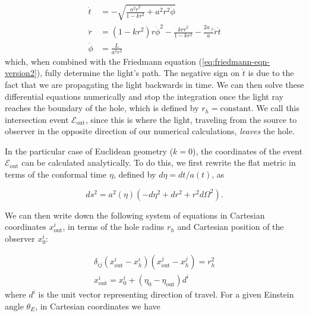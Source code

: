\begin{subequations}
  \begin{align}
    \dot{t} &= -\sqrt{\frac{a^2\dot{r}^2}{1-kr^2} + a^2r^2 \dot{\phi}}\\
    \ddot{r}  &= (1-kr^2)r\dot{\phi}^2 - \frac{kr\dot{r}^2}{1-kr^2} - \frac{2a_{,t}}{a}\dot{r}\dot{t}\\
    \dot{\phi} &= \frac{L}{a^2 r^2}
  \end{align}
  \label{eq:frw-null-geodesics}%
\end{subequations}
which, when combined with the Friedmann equation (\autoref{eq:friedmann-eqn-version2}), fully determine the light's path. The negative sign on $\dot{t}$ is due to the fact that we are propagating the light backwards in time. We can then solve these differential equations numerically and stop the integration once the light ray reaches the boundary of the hole, which is defined by $r_h = \text{constant}$. We call this intersection event $\mathcal{E}_{\text{out}}$, since this is where the light, traveling from the source to observer in the opposite direction of our numerical calculations, \emph{leaves} the hole. 

In the particular case of Euclidean geometry ($k = 0$), the coordinates of the event $\mathcal{E}_{\text{out}}$ can be calculated analytically. To do this, we first rewrite the flat metric in terms of the conformal time $\eta$, defined by $d\eta = dt/a(t)$, as

\begin{equation}
  ds^2 = a^2(\eta) \left ( -d \eta^2 + dr^2 + r^2 d \Omega^2 \right ).
  \label{eq:frw-metric-conformal-time}
\end{equation}

We can then write down the following system of equations in Cartesian coordinates $x^i_{\text{out}}$, in terms of the hole radius $r_h$ and Cartesian position of the observer $x^i_0$:

\begin{subequations}
  \begin{align}
  \delta_{ij} (x^i_{\text{out}} - x^i_h)(x^j_{\text{out}} - x^j_h) = r_h^2\\
  x^i_{\text{out}} = x^i_0 + (\eta_0 - \eta_{\text{out}})d^i    
  \end{align}
  \label{eq:flat-cartesian-frw}%
\end{subequations}
where $d^i$ is the unit vector representing direction of travel. For a given Einstein angle $\theta_E$, in Cartesian coordinates we have 

